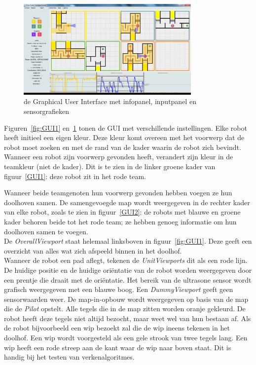 \documentclass[eind]{penoverslag}
\begin{document}
\begin{figure}[h] %
\centering
	\includegraphics[width=0.8\textwidth]{guiALL}
\caption{de Graphical User Interface met infopanel, inputpanel en sensorgrafieken}
\label{fig:GUI2}
\end{figure}

Figuren~\ref{fig:GUI1} en~\ref{fig:GUI2} tonen de GUI met verschillende instellingen. Elke robot heeft initieel een eigen kleur. Deze kleur komt overeen met het voorwerp dat de robot moet zoeken en met de rand van de kader waarin de robot zich bevindt. Wanneer een robot zijn voorwerp gevonden heeft, verandert zijn kleur in de teamkleur (niet de kader). Dit is te zien in de linker groene kader van figuur~\ref{GUI1}: deze robot zit in het rode team.

Wanneer beide teamgenoten hun voorwerp gevonden hebben voegen ze hun doolhoven samen. De samengevoegde map wordt weergegeven in de rechter kader van elke robot, zoals te zien in figuur~\ref{GUI2}: de robots met blauwe en groene kader behoren beide tot het rode team; ze hebben genoeg informatie om hun doolhoven samen te voegen.\\
De \textit{OverallViewport} staat helemaal linksboven in figuur~\ref{fig:GUI1}. Deze geeft een overzicht van alles wat zich afspeeld binnen in het doolhof.\\

Wanneer de robot een pad aflegt, tekenen de \textit{UnitViewports} dit als een rode lijn. De huidige positie en de huidige ori\"entatie van de robot worden weergegeven door een prentje die draait met de ori\"entatie. Het bereik van de ultrasone sensor wordt grafisch weergegeven met een blauwe boog. Een \textit{DummyViewport} geeft geen sensorwaarden weer. De map-in-opbouw wordt weergegeven op basis van de map die de \textit{Pilot} opstelt. Alle tegels die in de map zitten worden oranje gekleurd. De robot heeft deze tegels niet altijd bezocht, maar weet wel van hun bestaan af. Als de robot bijvoorbeeld een wip bezoekt zal die de wip ineens tekenen in het doolhof. Een wip wordt voorgesteld als een gele strook van twee tegels lang. Een wip heeft een rode streep aan de kant waar de wip naar boven staat. Dit is handig bij het testen van verkenalgoritmes.\\
\end{document}
